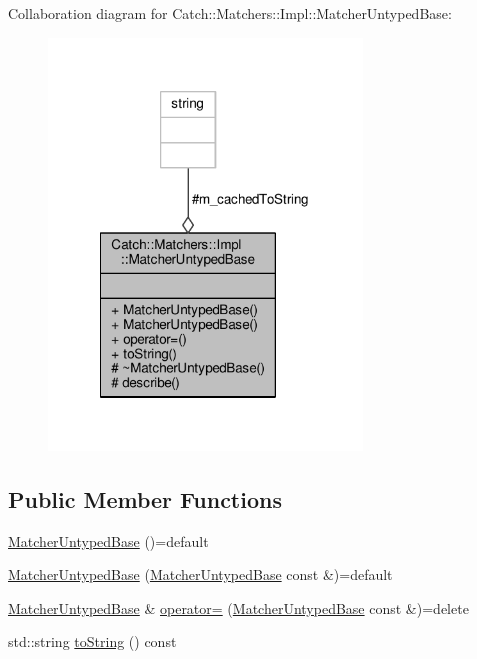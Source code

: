 Collaboration diagram for Catch\-:\-:Matchers\-:\-:Impl\-:\-:Matcher\-Untyped\-Base\-:
\nopagebreak
\begin{figure}[H]
\begin{center}
\leavevmode
\includegraphics[width=236pt]{class_catch_1_1_matchers_1_1_impl_1_1_matcher_untyped_base__coll__graph}
\end{center}
\end{figure}
\subsection*{Public Member Functions}
\begin{DoxyCompactItemize}
\item 
\hyperlink{class_catch_1_1_matchers_1_1_impl_1_1_matcher_untyped_base_ab65764dc245d85e2b268d3be870b650a}{Matcher\-Untyped\-Base} ()=default
\item 
\hyperlink{class_catch_1_1_matchers_1_1_impl_1_1_matcher_untyped_base_a985fd3c3ffcc9f2e8dc7a330130040b0}{Matcher\-Untyped\-Base} (\hyperlink{class_catch_1_1_matchers_1_1_impl_1_1_matcher_untyped_base}{Matcher\-Untyped\-Base} const \&)=default
\item 
\hyperlink{class_catch_1_1_matchers_1_1_impl_1_1_matcher_untyped_base}{Matcher\-Untyped\-Base} \& \hyperlink{class_catch_1_1_matchers_1_1_impl_1_1_matcher_untyped_base_a62668ccc47b64a9094dcb6413f9af80b}{operator=} (\hyperlink{class_catch_1_1_matchers_1_1_impl_1_1_matcher_untyped_base}{Matcher\-Untyped\-Base} const \&)=delete
\item 
std\-::string \hyperlink{class_catch_1_1_matchers_1_1_impl_1_1_matcher_untyped_base_a9667f989b08e52a1ce96c955456db8f9}{to\-String} () const 
\end{DoxyCompactItemize}
